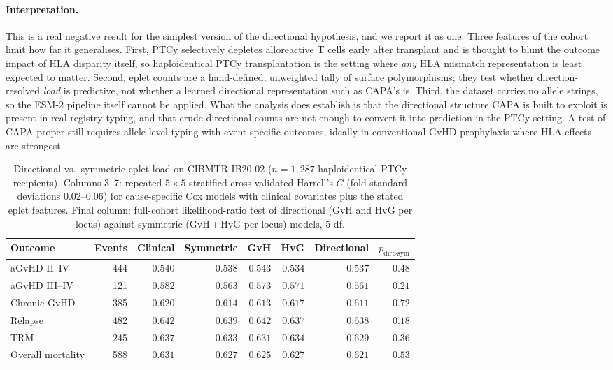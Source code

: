 \documentclass[11pt,a4paper]{article}
\begin{document}
\paragraph{Interpretation.}
This is a real negative result for the simplest version of the directional
hypothesis, and we report it as one.  Three features of the cohort limit how
far it generalises.  First, PTCy selectively depletes alloreactive T cells
early after transplant and is thought to blunt the outcome impact of HLA
disparity itself, so haploidentical PTCy transplantation is the setting
where \emph{any} HLA mismatch representation is least expected to matter.
Second, eplet counts are a hand-defined, unweighted tally of surface
polymorphisms; they test whether direction-resolved \emph{load} is
predictive, not whether a learned directional representation such as CAPA's
is.  Third, the dataset carries no allele strings, so the ESM-2 pipeline
itself cannot be applied.  What the analysis does establish is that the
directional structure CAPA is built to exploit is present in real registry
typing, and that crude directional counts are not enough to convert it into
prediction in the PTCy setting.  A test of CAPA proper still requires
allele-level typing with event-specific outcomes, ideally in conventional
GvHD prophylaxis where HLA effects are strongest.

\begin{table}[ht]
\centering
\caption{Directional vs.\ symmetric eplet load on CIBMTR IB20-02
  ($n=1{,}287$ haploidentical PTCy recipients).  Columns 3--7: repeated
  $5\times5$ stratified cross-validated Harrell's $C$ (fold standard
  deviations 0.02--0.06) for cause-specific Cox models with clinical
  covariates plus the stated eplet features.  Final column: full-cohort
  likelihood-ratio test of directional (GvH and HvG per locus) against
  symmetric (GvH\,+\,HvG per locus) models, 5 df.}
\label{tab:cibmtr}
\small
\begin{tabular}{lrrrrrrr}
\toprule
Outcome & Events & Clinical & Symmetric & GvH & HvG & Directional
  & $p_{\text{dir}>\text{sym}}$ \\
\midrule
aGvHD II--IV      & 444 & $0.540$ & $0.538$ & $0.543$ & $0.534$ & $0.537$ & $0.48$ \\
aGvHD III--IV     & 121 & $0.582$ & $0.563$ & $0.573$ & $0.571$ & $0.561$ & $0.21$ \\
Chronic GvHD      & 385 & $0.620$ & $0.614$ & $0.613$ & $0.617$ & $0.611$ & $0.72$ \\
Relapse           & 482 & $0.642$ & $0.639$ & $0.642$ & $0.637$ & $0.638$ & $0.18$ \\
TRM               & 245 & $0.637$ & $0.633$ & $0.631$ & $0.634$ & $0.629$ & $0.36$ \\
Overall mortality & 588 & $0.631$ & $0.627$ & $0.625$ & $0.627$ & $0.621$ & $0.53$ \\
\bottomrule
\end{tabular}
\end{table}
\end{document}
